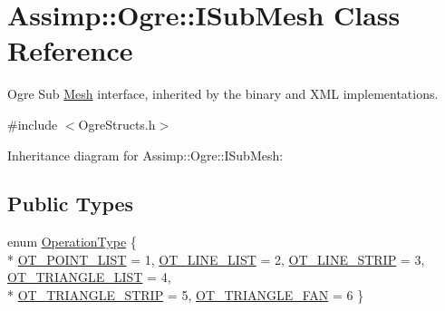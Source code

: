 \hypertarget{class_assimp_1_1_ogre_1_1_i_sub_mesh}{\section{Assimp\+:\+:Ogre\+:\+:I\+Sub\+Mesh Class Reference}
\label{class_assimp_1_1_ogre_1_1_i_sub_mesh}
}


Ogre Sub \hyperlink{class_assimp_1_1_ogre_1_1_mesh}{Mesh} interface, inherited by the binary and X\+M\+L implementations.  




{\ttfamily \#include $<$Ogre\+Structs.\+h$>$}



Inheritance diagram for Assimp\+:\+:Ogre\+:\+:I\+Sub\+Mesh\+:
\subsection*{Public Types}
\begin{DoxyCompactItemize}
\item 
enum \hyperlink{class_assimp_1_1_ogre_1_1_i_sub_mesh_a430f1cb3dbd9d5043ed751f8810ee0a5}{Operation\+Type} \{ \\*
\hyperlink{class_assimp_1_1_ogre_1_1_i_sub_mesh_a430f1cb3dbd9d5043ed751f8810ee0a5a577e5421c4fe2c5fa8cbae84aecf0a6b}{O\+T\+\_\+\+P\+O\+I\+N\+T\+\_\+\+L\+I\+S\+T} = 1, 
\hyperlink{class_assimp_1_1_ogre_1_1_i_sub_mesh_a430f1cb3dbd9d5043ed751f8810ee0a5a68b0c55253a59224ea6cf8182b901bb4}{O\+T\+\_\+\+L\+I\+N\+E\+\_\+\+L\+I\+S\+T} = 2, 
\hyperlink{class_assimp_1_1_ogre_1_1_i_sub_mesh_a430f1cb3dbd9d5043ed751f8810ee0a5aef662e562b2c8c64640d6c23908d9bff}{O\+T\+\_\+\+L\+I\+N\+E\+\_\+\+S\+T\+R\+I\+P} = 3, 
\hyperlink{class_assimp_1_1_ogre_1_1_i_sub_mesh_a430f1cb3dbd9d5043ed751f8810ee0a5afad1668541b961e1e51a19b47f789163}{O\+T\+\_\+\+T\+R\+I\+A\+N\+G\+L\+E\+\_\+\+L\+I\+S\+T} = 4, 
\\*
\hyperlink{class_assimp_1_1_ogre_1_1_i_sub_mesh_a430f1cb3dbd9d5043ed751f8810ee0a5ac099d125e4b422e9446da36d7821d7d1}{O\+T\+\_\+\+T\+R\+I\+A\+N\+G\+L\+E\+\_\+\+S\+T\+R\+I\+P} = 5, 
\hyperlink{class_assimp_1_1_ogre_1_1_i_sub_mesh_a430f1cb3dbd9d5043ed751f8810ee0a5a3dd262b86fe0a772356cc7c809eb9201}{O\+T\+\_\+\+T\+R\+I\+A\+N\+G\+L\+E\+\_\+\+F\+A\+N} = 6
 \}
\end{DoxyCompactItemize}
